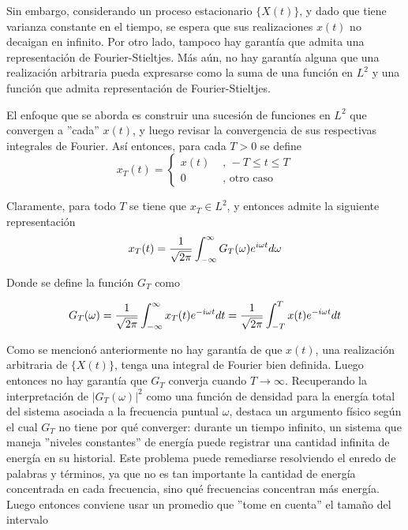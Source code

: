 Sin embargo, considerando un proceso estacionario $\{ X(t) \}$, y dado que tiene varianza constante 
en el tiempo, se 
espera que sus realizaciones $x(t)$ no decaigan en infinito. Por otro lado, tampoco hay garant\'ia
que admita una representaci\'on de Fourier-Stieltjes. M\'as a\'un, no hay garant\'ia alguna que
una realizaci\'on arbitraria pueda expresarse como la suma de una funci\'on en $L^2$ y una
funci\'on que admita representaci\'on de Fourier-Stieltjes.

El enfoque que se aborda es construir una sucesi\'on de funciones 
en $L^{2}$
que convergen a ''cada''
$x(t)$, y luego revisar la convergencia de sus respectivas integrales de Fourier.
As\'i entonces, para cada $T>0$ se define
\begin{equation}
x_T(t) = 
\begin{cases}
x(t) & \text{ , } -T\leq t \leq T
\\
0 & \text{ , otro caso}
\end{cases}
\end{equation}

Claramente, para todo $T$ se tiene que $x_T \in L^2$, y entonces admite la siguiente 
representaci\'on
\begin{equation}
x_T (t) = \frac{1}{\sqrt{2 \pi}} \int_{-\infty}^{\infty} G_T(\omega) e^{i \omega t} d\omega
\end{equation}

Donde se define la funci\'on $G_T$ como

\begin{equation}
G_T (\omega) = \frac{1}{\sqrt{2 \pi}} \int_{-\infty}^{\infty} x_T(t) e^{-i \omega t} dt
= \frac{1}{\sqrt{2 \pi}} \int_{-T}^{T} x(t) e^{-i \omega t} dt
\end{equation}

Como se mencion\'o anteriormente no hay garant\'ia de que $x(t)$, una realizaci\'on arbitraria de
$\{X(t)\}$, tenga una integral de Fourier bien definida. Luego entonces no hay garant\'ia que 
$G_T$ converja cuando $T\rightarrow \infty$. Recuperando la interpretaci\'on de 
$\left| G_T(\omega) \right|^{2}$ como una funci\'on de densidad para la energ\'ia total del sistema 
asociada a la frecuencia
puntual $\omega$, destaca un argumento f\'isico seg\'un el cual $G_T$ no tiene por qu\'e converger:
durante un tiempo infinito, un sistema que maneja ''niveles constantes'' de 
energ\'ia puede registrar una cantidad infinita de energ\'ia en su historial. 
Este problema puede remediarse resolviendo el enredo de palabras y t\'erminos, 
ya que no es tan importante la
cantidad de energ\'ia concentrada en cada frecuencia, sino qu\'e frecuencias concentran m\'as
energ\'ia. Luego entonces conviene usar un promedio que ''tome en cuenta'' el tama\~no
del intervalo

